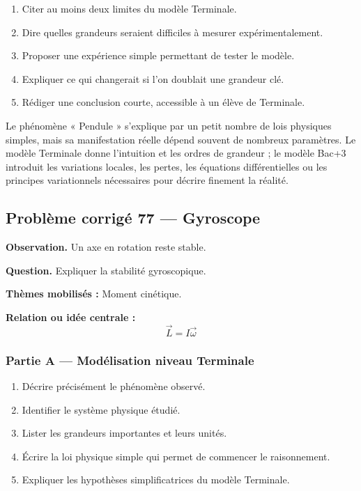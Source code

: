 \documentclass[11pt,a4paper]{article}
\begin{document}
\begin{enumerate}
  \item Citer au moins deux limites du modèle Terminale.
  \item Dire quelles grandeurs seraient difficiles à mesurer expérimentalement.
  \item Proposer une expérience simple permettant de tester le modèle.
  \item Expliquer ce qui changerait si l'on doublait une grandeur clé.
  \item Rédiger une conclusion courte, accessible à un élève de Terminale.
\end{enumerate}

\begin{corrigebox}
Le phénomène « Pendule » s'explique par un petit nombre de lois physiques simples, mais sa manifestation réelle dépend souvent de nombreux paramètres. Le modèle Terminale donne l'intuition et les ordres de grandeur ; le modèle Bac+3 introduit les variations locales, les pertes, les équations différentielles ou les principes variationnels nécessaires pour décrire finement la réalité.
\end{corrigebox}

\subsection{Problème corrigé 77 — Gyroscope}

\begin{exercicebox}
\textbf{Observation.} Un axe en rotation reste stable.

\medskip
\textbf{Question.} Expliquer la stabilité gyroscopique.

\medskip
\textbf{Thèmes mobilisés :} Moment cinétique.

\medskip
\textbf{Relation ou idée centrale :}
\[
\vec L=I\vec\omega
\]
\end{exercicebox}

\subsubsection*{Partie A — Modélisation niveau Terminale}

\begin{enumerate}
  \item Décrire précisément le phénomène observé.
  \item Identifier le système physique étudié.
  \item Lister les grandeurs importantes et leurs unités.
  \item Écrire la loi physique simple qui permet de commencer le raisonnement.
  \item Expliquer les hypothèses simplificatrices du modèle Terminale.
\end{enumerate}
\end{document}
